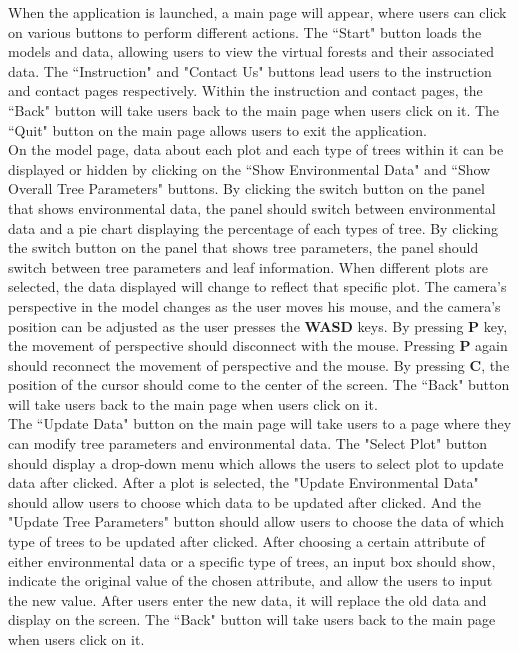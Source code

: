 \documentclass[12pt, titlepage]{article}
\begin{document}
\noindent When the application is launched, a main page will appear, where users can click on various buttons to perform different actions. The ``Start" button loads the models and data, allowing users to view the virtual forests and their associated data. The ``Instruction" and "Contact Us" buttons lead users to the instruction and contact pages respectively. Within the instruction and contact pages, the ``Back" button will take users back to the main page when users click on it. The ``Quit" button on the main page allows users to exit the application.\\


\noindent On the model page, data about each plot and each type of trees within it can be displayed or hidden by clicking on the ``Show Environmental Data" and ``Show Overall Tree Parameters" buttons. By clicking the switch button on the panel that shows environmental data, the panel should switch between environmental data and a pie chart displaying the percentage of each types of tree. By clicking the switch button on the panel that shows tree parameters, the panel should switch between tree parameters and leaf information. When different plots are selected, the data displayed will change to reflect that specific plot. The camera's perspective in the model changes as the user moves his mouse, and the camera's position can be adjusted as the user presses the \textbf{WASD} keys. By pressing \textbf{P} key, the movement of perspective should disconnect with the mouse. Pressing \textbf{P} again should reconnect the movement of perspective and the mouse. By pressing \textbf{C}, the position of the cursor should come to the center of the screen. The ``Back" button will take users back to the main page when users click on it.\\

\noindent The ``Update Data" button on the main page will take users to a page where they can modify tree parameters and environmental data. The "Select Plot" button should display a drop-down menu which allows the users to select plot to update data after clicked. After a plot is selected, the "Update Environmental Data" should allow users to choose which data to be updated after clicked. And the "Update Tree Parameters" button should allow users to choose the data of which type of trees to be updated after clicked. After choosing a certain attribute of either environmental data or a specific type of trees, an input box should show, indicate the original value of the chosen attribute, and allow the users to input the new value. After users enter the new data, it will replace the old data and display on the screen.
The ``Back" button will take users back to the main page when users click on it.
\end{document}
